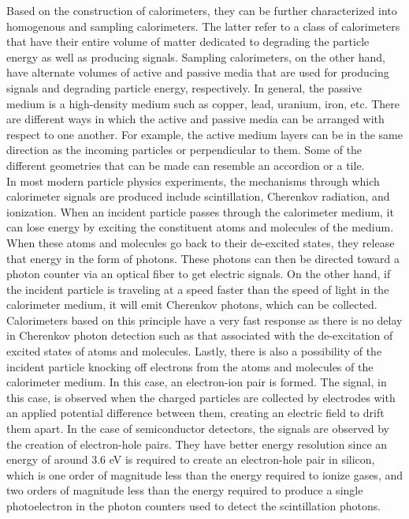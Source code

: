 Based on the construction of calorimeters, they can be further characterized into homogenous and sampling calorimeters. The latter refer to a class of calorimeters that have their entire volume of matter dedicated to degrading the particle energy as well as producing signals. Sampling calorimeters, on the other hand, have alternate volumes of active and passive media that are used for producing signals and degrading particle energy, respectively. In general, the passive medium is a high-density medium such as copper, lead, uranium, iron, etc. There are different ways in which the active and passive media can be arranged with respect to one another. For example, the active medium layers can be in the same direction as the incoming particles or perpendicular to them. Some of the different geometries that can be made can resemble an accordion or a tile. \\

In most modern particle physics experiments, the mechanisms through which calorimeter signals are produced include scintillation, Cherenkov radiation, and ionization. When an incident particle passes through the calorimeter medium, it can lose energy by exciting the constituent atoms and molecules of the medium. When these atoms and molecules go back to their de-excited states, they release that energy in the form of photons. These photons can then be directed toward a photon counter via an optical fiber to get electric signals. On the other hand, if the incident particle is traveling at a speed faster than the speed of light in the calorimeter medium, it will emit Cherenkov photons, which can be collected. Calorimeters based on this principle have a very fast response as there is no delay in Cherenkov photon detection such as that associated with the de-excitation of excited states of atoms and molecules. Lastly, there is also a possibility of the incident particle knocking off electrons from the atoms and molecules of the calorimeter medium. In this case, an electron-ion pair is formed. The signal, in this case, is observed when the charged particles are collected by electrodes with an applied potential difference between them, creating an electric field to drift them apart. In the case of semiconductor detectors, the signals are observed by the creation of electron-hole pairs. They have better energy resolution since an energy of around 3.6 eV is required to create an electron-hole pair in silicon, which is one order of magnitude less than the energy required to ionize gases, and two orders of magnitude less than the energy required to produce a single photoelectron in the photon counters used to detect the scintillation photons. \\

